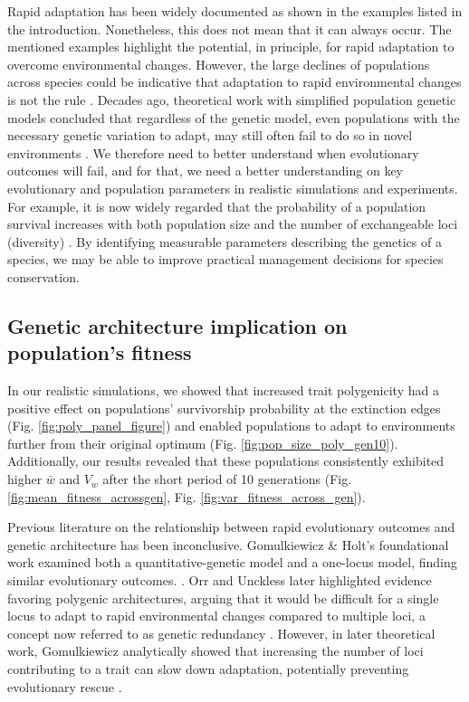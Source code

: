 \documentclass{article}
\begin{document}
Rapid adaptation has been widely documented as shown in the examples listed in the introduction. Nonetheless, this does not mean that it can always occur. The mentioned examples highlight the potential, in principle, for rapid adaptation to overcome environmental changes. However, the large declines of populations across species could be indicative that adaptation to rapid environmental changes is not the rule \citep{ias_ipbes_2023}. Decades ago, theoretical work with simplified population genetic models concluded that regardless of the genetic model, even populations with the necessary genetic variation to adapt, may still often fail to do so in novel environments \citep{Gomulkiewicz1995-sj}. We therefore need to better understand when evolutionary outcomes will fail, and for that, we need a better understanding on key evolutionary and population parameters in realistic simulations and experiments. For example, it is now widely regarded that the probability of a population survival increases with both population size and the number of exchangeable loci (diversity) \citep{Newman1997-tx, Markert2010-wc, Nabutanyi2022-jb}. By identifying measurable parameters describing the genetics of a species, we may be able to improve practical management decisions for species conservation. 

\subsection{Genetic architecture implication on population's fitness}
In our realistic simulations, we showed that increased trait polygenicity had a positive effect on populations' survivorship probability at the extinction edges (Fig. \ref{fig:poly_panel_figure}) and enabled populations to adapt to environments further from their original optimum (Fig. \ref{fig:pop_size_poly_gen10}). Additionally, our results revealed that these populations consistently exhibited higher  $\bar{w}$ and $V_w$ after the short period of 10 generations (Fig. \ref{fig:mean_fitness_acrossgen}, Fig. \ref{fig:var_fitness_across_gen}). 

Previous literature on the relationship between rapid evolutionary outcomes and genetic architecture has been inconclusive. Gomulkiewicz \& Holt’s foundational work examined both a quantitative-genetic model and a one-locus model, finding similar evolutionary outcomes. \citep{Gomulkiewicz1995-sj}. Orr and Unckless later highlighted evidence favoring polygenic architectures, arguing that it would be difficult for a single locus to adapt to rapid environmental changes compared to multiple loci, a concept now referred to as genetic redundancy \citep{Laruson2020-kd}. However, in later theoretical work, Gomulkiewicz analytically showed that increasing the number of loci contributing to a trait can slow down adaptation, potentially preventing evolutionary rescue \citep{Gomulkiewicz2010-wr}.
\end{document}
